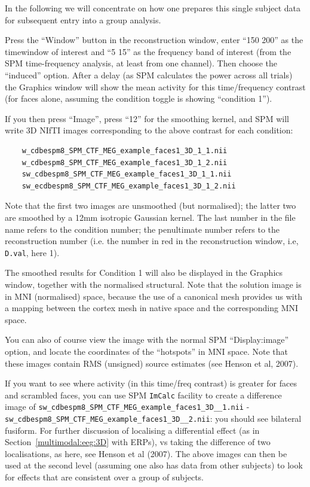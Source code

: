 In the following we will concentrate on how one prepares this single subject data for subsequent entry into a group analysis.

Press the ``Window'' button in the reconstruction window, enter ``150 200'' as the timewindow of interest and ``5 15'' as the frequency band of interest (from the SPM time-frequency analysis, at least from one channel). Then choose the ``induced'' option. After a delay (as SPM calculates the power across all trials) the Graphics window will show the mean activity for this time/frequency contrast (for faces alone, assuming the condition toggle is showing ``condition 1'').

If you then press ``Image'', press ``12'' for the smoothing kernel, and SPM will write 3D NIfTI images corresponding to the above contrast for each condition:

\begin{verbatim}
    w_cdbespm8_SPM_CTF_MEG_example_faces1_3D_1_1.nii
    w_cdbespm8_SPM_CTF_MEG_example_faces1_3D_1_2.nii
    sw_cdbespm8_SPM_CTF_MEG_example_faces1_3D_1_1.nii
    sw_ecdbespm8_SPM_CTF_MEG_example_faces1_3D_1_2.nii
\end{verbatim}

Note that the first two images are unsmoothed (but normalised); the latter two are smoothed by a 12mm isotropic Gaussian kernel. The last number in the file name refers to the condition number; the penultimate number refers to the reconstruction number (i.e. the number in red in the reconstruction window, i.e, \texttt{D.val}, here 1).

The smoothed results for Condition 1 will also be displayed in the Graphics window, together with the normalised structural. Note that the solution image is in MNI (normalised) space, because the use of a canonical mesh provides us with a mapping between the cortex mesh in native space and the corresponding MNI space.

You can also of course view the image with the normal SPM ``Display:image'' option, and locate the coordinates of the ``hotspots'' in MNI space. Note that these images contain RMS (unsigned) source estimates (see Henson et al, 2007).

If you want to see where activity (in this time/freq contrast) is greater for faces and scrambled faces, you can use SPM \texttt{ImCalc} facility to create a difference image of \texttt{sw\_\-cdbespm8\_\-SPM\_\-CTF\_\-MEG\_\-example\_\-faces1\_\-3D\_\_\-1.nii} - \texttt{sw\_\-cdbespm8\_\-SPM\_\-CTF\_\-MEG\_\-example\_\-faces1\_\-3D\_\_\-2.nii}: you should see bilateral fusiform. For further discussion of localising a differential effect (as in Section~\ref{multimodal:eeg:3D} with ERPs), vs taking the difference of two localisations, as here, see Henson et al (2007). The above images can then be used at the second level (assuming one also has data from other subjects) to look for effects that are consistent over a group of subjects.

